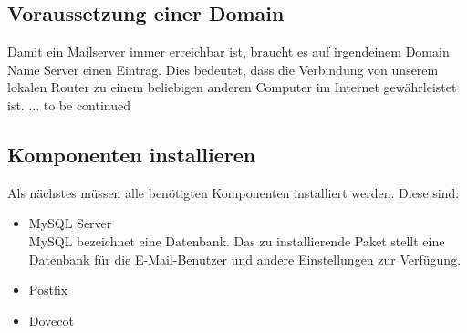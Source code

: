 \subsection{Voraussetzung einer Domain}
Damit ein Mailserver immer erreichbar ist, braucht es auf irgendeinem Domain Name Server einen Eintrag. Dies bedeutet, dass die Verbindung von unserem lokalen Router zu einem beliebigen anderen Computer im Internet gewährleistet ist.
... to be continued








\subsection{Komponenten installieren}
Als nächstes müssen alle benötigten Komponenten installiert werden.
Diese sind:
\begin{itemize}
\item MySQL Server \\
MySQL bezeichnet eine Datenbank. Das zu installierende Paket stellt eine Datenbank für die E-Mail-Benutzer und andere Einstellungen zur Verfügung.

\item Postfix \\

\item Dovecot \\

\end{itemize}


